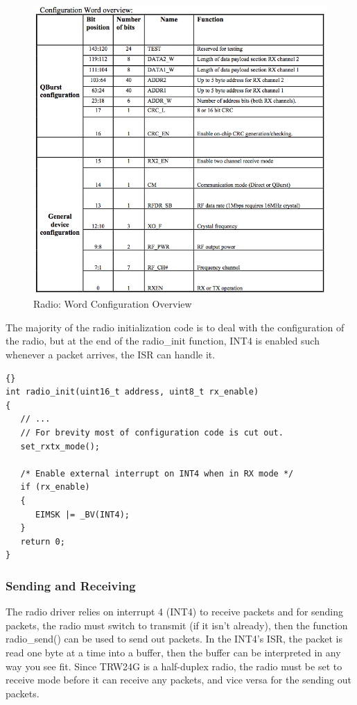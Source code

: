 \begin{figure}[tpb]
  \begin{center}
    \includegraphics[width=125mm]{imageSources/radioConfigOverview.png}
  \end{center}
  \caption{Radio: Word Configuration Overview} 
  \label{radioConfigOverview}
\end{figure}

The majority of the radio initialization code is to deal with the configuration of the radio, but at the end of the radio\_init function, INT4 is enabled such whenever a packet arrives, the ISR can handle it.

\lstset{language=c}
\lstset{commentstyle=\textit}
\begin{lstlisting}[frame=trbl]{}
int radio_init(uint16_t address, uint8_t rx_enable)
{
   // ...
   // For brevity most of configuration code is cut out.
   set_rxtx_mode();

   /* Enable external interrupt on INT4 when in RX mode */
   if (rx_enable)
   {
      EIMSK |= _BV(INT4);
   }
   return 0;
}
\end{lstlisting}

\subsubsection{Sending and Receiving}
The radio driver relies on interrupt 4 (INT4) to receive packets and for sending packets, the radio must switch to transmit (if it isn't already), then the function radio\_send() can be used to send out packets. In the INT4's ISR, the packet is read one byte at a time into a buffer, then the buffer can be interpreted in any way you see fit. Since TRW24G is a half-duplex radio, the radio must be set to receive mode before it can receive any packets, and vice versa for the sending out packets.

